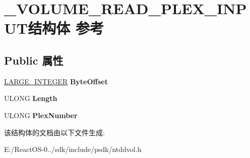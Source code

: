 \hypertarget{struct___v_o_l_u_m_e___r_e_a_d___p_l_e_x___i_n_p_u_t}{}\section{\+\_\+\+V\+O\+L\+U\+M\+E\+\_\+\+R\+E\+A\+D\+\_\+\+P\+L\+E\+X\+\_\+\+I\+N\+P\+U\+T结构体 参考}
\label{struct___v_o_l_u_m_e___r_e_a_d___p_l_e_x___i_n_p_u_t}
\subsection*{Public 属性}
\begin{DoxyCompactItemize}
\item 
\mbox{\label{struct___v_o_l_u_m_e___r_e_a_d___p_l_e_x___i_n_p_u_t_ad9dfdc5e63786b2446f16a1a04a04bc3}} 
\hyperlink{union___l_a_r_g_e___i_n_t_e_g_e_r}{L\+A\+R\+G\+E\+\_\+\+I\+N\+T\+E\+G\+ER} {\bfseries Byte\+Offset}
\item 
\mbox{\label{struct___v_o_l_u_m_e___r_e_a_d___p_l_e_x___i_n_p_u_t_a478a13c3707bf1cd7e23f2d6546b4d0a}} 
U\+L\+O\+NG {\bfseries Length}
\item 
\mbox{\label{struct___v_o_l_u_m_e___r_e_a_d___p_l_e_x___i_n_p_u_t_ac72ef1da83562382e8938bb2901dac63}} 
U\+L\+O\+NG {\bfseries Plex\+Number}
\end{DoxyCompactItemize}


该结构体的文档由以下文件生成\+:\begin{DoxyCompactItemize}
\item 
E\+:/\+React\+O\+S-\/0../sdk/include/psdk/ntddvol.\+h\end{DoxyCompactItemize}
